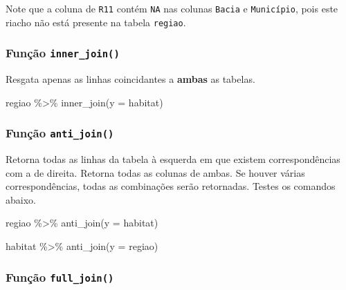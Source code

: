 \documentclass[
]{book}
\newenvironment{Shaded}{\begin{snugshade}}{\end{snugshade}}
\newcommand{\AttributeTok}[1]{\textcolor[rgb]{0.77,0.63,0.00}{#1}}
\newcommand{\FunctionTok}[1]{\textcolor[rgb]{0.00,0.00,0.00}{#1}}
\newcommand{\NormalTok}[1]{#1}
\newcommand{\SpecialCharTok}[1]{\textcolor[rgb]{0.00,0.00,0.00}{#1}}
\begin{document}
Note que a coluna de \texttt{R11} contém \texttt{NA} nas colunas \texttt{Bacia} e \texttt{Município}, pois este riacho não está presente na tabela \texttt{regiao}.

\hypertarget{funuxe7uxe3o-inner_join}{%
\subsubsection{\texorpdfstring{Função \texttt{inner\_join()}}{Função inner\_join()}}\label{funuxe7uxe3o-inner_join}}

Resgata apenas as linhas coincidantes a \textbf{ambas} as tabelas.

\begin{Shaded}
\begin{Highlighting}[]
\NormalTok{regiao }\SpecialCharTok{\%\textgreater{}\%} \FunctionTok{inner\_join}\NormalTok{(}\AttributeTok{y =}\NormalTok{ habitat)}
\end{Highlighting}
\end{Shaded}

\hypertarget{funuxe7uxe3o-anti_join}{%
\subsubsection{\texorpdfstring{Função \texttt{anti\_join()}}{Função anti\_join()}}\label{funuxe7uxe3o-anti_join}}

Retorna todas as linhas da tabela à esquerda em que existem correspondências com a de direita. Retorna todas as colunas de ambas. Se houver várias correspondências, todas as combinações serão retornadas. Testes os comandos abaixo.

\begin{Shaded}
\begin{Highlighting}[]
\NormalTok{regiao }\SpecialCharTok{\%\textgreater{}\%} \FunctionTok{anti\_join}\NormalTok{(}\AttributeTok{y =}\NormalTok{ habitat)}
\end{Highlighting}
\end{Shaded}

\begin{Shaded}
\begin{Highlighting}[]
\NormalTok{habitat }\SpecialCharTok{\%\textgreater{}\%} \FunctionTok{anti\_join}\NormalTok{(}\AttributeTok{y =}\NormalTok{ regiao)}
\end{Highlighting}
\end{Shaded}

\hypertarget{funuxe7uxe3o-full_join}{%
\subsubsection{\texorpdfstring{Função \texttt{full\_join()}}{Função full\_join()}}\label{funuxe7uxe3o-full_join}}
\end{document}
